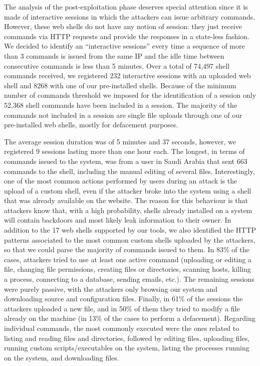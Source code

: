 The analysis of the post-exploitation phase deserves special attention since it is made of interactive sessions in which the attackers can issue arbitrary commands. However, these web shells do not have any notion of session: they just receive commands via HTTP requests and provide the responses in a state-less fashion. We decided to identify an ``interactive sessions'' every time a sequence of more than 3 commands is issued from the same IP and the idle time between consecutive commands is less than 5 minutes.
Over a total of 74,497 shell commands received, we registered 232 interactive sessions with an uploaded web shell and 8268 with one of our pre-installed shells. Because of the minimum number of commands threshold we imposed for the identification of a session only 52,368 shell commands have been included in a session. The majority of the commands not included in a session are single file uploads through one of our pre-installed web shells, mostly for defacement purposes.

The average session duration was of 5 minutes and 37 seconds, however, we registered 9 sessions lasting more than one hour each. The longest, in terms of commands issued to the system, was from a user in Saudi Arabia that sent 663 commands to the shell, including the manual editing of several files. Interestingly, one of the most common actions performed by users during an attack is the upload of a custom shell, even if the attacker broke into the system using a shell that was already available on the website. The reason for this behaviour is that attackers know that, with a high probability, shells already installed on a system will contain backdoors and most likely leak information to their owner. In addition to the 17 web shells supported by our tools, we also identified the HTTP patterns associated to the most common custom shells uploaded by the attackers, so that we could parse the majority of commands issued to them.
In 83\% of the cases, attackers tried to use at least one active command (uploading or editing a file, changing file permissions, creating files or directories, scanning hosts, killing a process, connecting to a database, sending emails, etc.). The remaining sessions were purely passive, with the attackers only browsing our system and downloading source and configuration files.
Finally, in 61\% of the sessions the attackers uploaded a new file, and in 50\% of them they tried to modify a file already on the machine (in 13\% of the cases to perform a defacement). Regarding individual commands, the most commonly executed were the ones related to listing and reading files and directories, followed by editing files, uploading files, running custom scripts/executables on the system, listing the processes running on the system, and downloading files.

